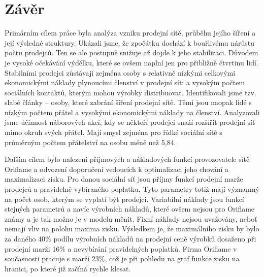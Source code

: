 \documentclass[a4wide,12pt]{report}
\begin{document}
\chapter*{Závěr}
\addtocounter{chapter}{1}
Primárním cílem práce byla analýza vzniku prodejní sítě, průběhu jejího šíření a její výsledné struktury. Ukázali jsme, že zpočátku dochází k bouřlivému nárůstu počtu prodejců. Ten se ale postupně snižuje až dojde k jeho stabilizaci. Důvodem je vysoké očekávání výdělku, které se ovšem naplní jen pro přibližně čtvrtinu lidí. Stabilními prodejci zůstávají zejména osoby s relativně nízkými celkovými ekonomickými náklady plynoucími členství v prodejní síti a vysokým počtem sociálních kontaktů, kterým mohou výrobky distribuovat. Identifikovali jsme tzv. slabé články -- osoby, které zabrání šíření prodejní sítě. Těmi jsou naopak lidé s nízkým počtem přátel a vysokými ekonomickými náklady na členství. Analyzovali jsme účinnost náborových akcí, kdy se někteří prodejci snaží rozšířit prodejní síť mimo okruh svých přátel. Mají smysl zejména pro řídké sociální sítě s průměrným počtem přátelství na osobu méně než 5,84.

Dalším cílem bylo nalezení příjmových a nákladových funkcí provozovatele sítě Oriflame a odvození doporučení vedoucích k optimalizaci jeho chování a maximalizaci zisku. Pro danou sociální síť jsou příjmy funkcí prodejní marže prodejců a pravidelně vybíraného poplatku. Tyto parametry totiž mají významný na počet osob, kterým se vyplatí být prodejci. Variabilní náklady jsou funkcí stejných parametrů a navíc výrobních nákladů, které ovšem nejsou pro Oriflame známy a je tak možno je v modelu měnit. Fixní náklady nejsou uvažovány, neboť nemají vliv na polohu maxima zisku. Výsledkem je, že maximálního zisku by bylo za daného 40\% podílu výrobních nákladů na prodejní ceně výrobků dosaženo při prodejní marži 16\% a nevybírání pravidelných poplatků. Firma Oriflame v současnosti pracuje s marží 23\%, což je při pohledu na graf funkce zisku na hranici, po které již začíná rychle klesat.
\end{document}

